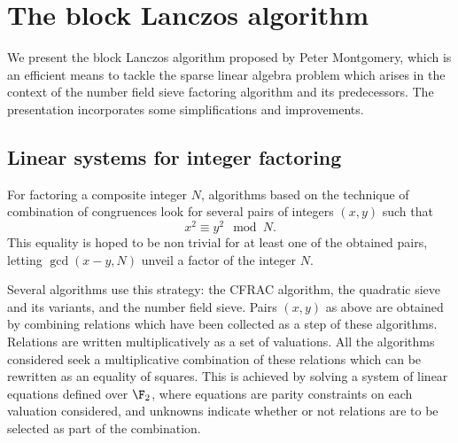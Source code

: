 \def\bfv{\mathbf{v}}
\def\bfc{\mathbf{c}}
\def\bfp{\mathbf{p}}
\def\bfw{\mathbf{w}}
\def\bft{\mathbf{t}}
\def\bfd{\mathbf{d}}
\def\bfX{\mathbf{X}}
\def\bfS{\mathbf{S}}
\def\bfx{\mathbf{x}}
\def\bfSigma{\mathbf{\Sigma}}
\def\bfdelta{\mathbf{\delta}}
\def\bfDelta{\mathbf{\Delta}}
\def\cO{\mathop{\mathcal{O}}}
\def\barmatrix#1#2#3#4{\left(\begin{array}{c|c}#1&#2\\\hline#3&#4\end{array}\right)}
\def\barvector#1#2{\left(\begin{array}{c|c}#1&#2\end{array}\right)}


\ifx\thechapter\undefined\else

\author{\ChapSevenAuthorOne}

\chapterauthor{\ChapSevenAuthorOne}

\setcounter{chapter}{6}


\chapter{The block Lanczos algorithm}\label{chap7:blocklanczos}

\contributor{\ChapSevenAuthorOne
\affiliation{\ChapSevenAuthorOneAffiliation}}


We present the block Lanczos algorithm proposed by Peter Montgomery,
which is an efficient means to tackle the sparse linear algebra problem which
arises in the context of the number field sieve factoring algorithm and
its predecessors. The presentation incorporates some
simplifications and improvements.

\fi

\section{Linear systems for integer factoring}
\label{sec:blocklanczos:intro}

For factoring a composite integer $N$, algorithms based on the technique
of combination of congruences look for several pairs of integers $(x,y)$
such that $$x^2\equiv y^2\mod N.$$ This equality is hoped to be non
trivial for at least one of the obtained pairs, letting $\gcd(x-y,N)$
unveil a factor of the integer $N$.

Several algorithms use this strategy: the CFRAC algorithm,  the
quadratic sieve and its variants, and the number field sieve. Pairs
$(x,y)$ as above are obtained by combining relations which have been collected
as a step of these algorithms. Relations are written multiplicatively as
a set of valuations. All the algorithms considered seek a multiplicative
combination of these relations which can be rewritten as an equality of
squares. This is achieved by solving a system of linear equations defined
over $\F_2$, where equations are parity constraints on each valuation
considered, and unknowns indicate whether or not relations are to be
selected as part of the combination.


